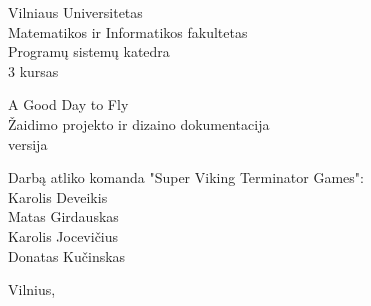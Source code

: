 \begin{titlepage}
    \begin{center}

        {\large
            Vilniaus Universitetas \\
            Matematikos ir Informatikos fakultetas \\
            Programų sistemų katedra \\
            3 kursas
        }

        \vspace{\fill}

        {\huge
            A Good Day to Fly
        } \\[0.5cm]
        {\large
            Žaidimo projekto ir dizaino dokumentacija \\
            \versionString{} versija
        }

        \vspace{3cm}

        \begin{flushright}
            \begin{minipage}{0.4\textwidth}
                Darbą atliko komanda "Super Viking Terminator Games": \\
                Karolis Deveikis                                      \\
                Matas Girdauskas                                      \\
                Karolis Jocevičius                                    \\
                Donatas Kučinskas
            \end{minipage}
        \end{flushright}

        \vspace{\fill}

        {\large Vilnius, \the\year}

    \end{center}
\end{titlepage}
